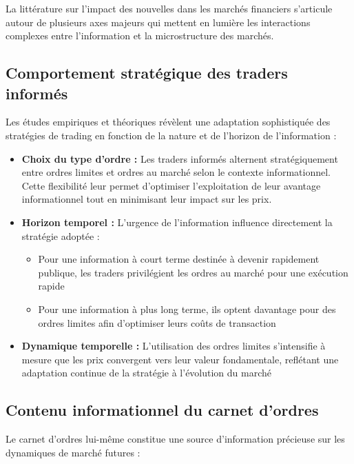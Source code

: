 \documentclass[12pt,a4paper]{article}
\theoremstyle{definition}
\theoremstyle{remark}
\begin{document}
    La littérature sur l'impact des nouvelles dans les marchés financiers s'articule autour de plusieurs axes majeurs qui mettent en lumière les interactions complexes entre l'information et la microstructure des marchés.

    \subsection{Comportement stratégique des traders informés}

    Les études empiriques et théoriques révèlent une adaptation sophistiquée des stratégies de trading en fonction de la nature et de l'horizon de l'information :

    \begin{itemize}
        \item \textbf{Choix du type d'ordre :} Les traders informés alternent stratégiquement entre ordres limites et ordres au marché selon le contexte informationnel. Cette flexibilité leur permet d'optimiser l'exploitation de leur avantage informationnel tout en minimisant leur impact sur les prix.
        
        \item \textbf{Horizon temporel :} L'urgence de l'information influence directement la stratégie adoptée :
        \begin{itemize}
            \item Pour une information à court terme destinée à devenir rapidement publique, les traders privilégient les ordres au marché pour une exécution rapide
            \item Pour une information à plus long terme, ils optent davantage pour des ordres limites afin d'optimiser leurs coûts de transaction
        \end{itemize}
        
        \item \textbf{Dynamique temporelle :} L'utilisation des ordres limites s'intensifie à mesure que les prix convergent vers leur valeur fondamentale, reflétant une adaptation continue de la stratégie à l'évolution du marché
    \end{itemize}

    \subsection{Contenu informationnel du carnet d'ordres}

    Le carnet d'ordres lui-même constitue une source d'information précieuse sur les dynamiques de marché futures :
\end{document}
